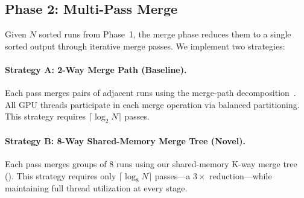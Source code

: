 \documentclass[conference,10pt]{IEEEtran}
\begin{document}
\begin{algorithm}[t]
  \caption{Bitonic Sort Run Generation}
  \label{alg:run_gen}
  \BlankLine
\end{algorithm}

\subsection{Phase 2: Multi-Pass Merge}
\label{sec:merge_phase}

Given $N$ sorted runs from Phase~1, the merge phase reduces them to a single
sorted output through iterative merge passes.  We implement two strategies:

\paragraph{Strategy A: 2-Way Merge Path (Baseline).}
Each pass merges pairs of adjacent runs using the merge-path
decomposition~\cite{green2012}.  All GPU threads participate in each merge
operation via balanced partitioning.  This strategy requires
$\lceil\log_2 N\rceil$ passes.

\paragraph{Strategy B: 8-Way Shared-Memory Merge Tree (Novel).}
Each pass merges groups of 8 runs using our shared-memory K-way merge tree
().  This strategy requires only $\lceil\log_8 N\rceil$
passes---a $3\times$ reduction---while maintaining full thread utilization
at every stage.
\end{document}
